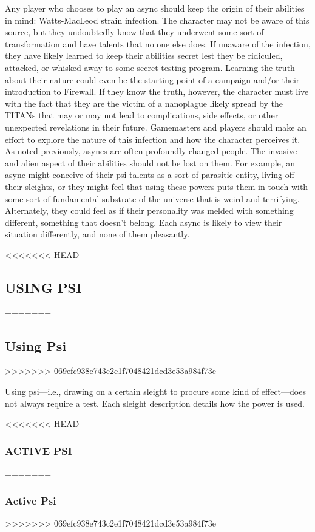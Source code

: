 Any player who chooses to play an async should keep the origin of their abilities in mind: Watts-MacLeod strain infection. The character may not be aware of this source, but they undoubtedly know that they underwent some sort of transformation and have talents that no one else does. If unaware of the infection, they have likely learned to keep their abilities secret lest they be ridiculed, attacked, or whisked away to some secret testing program. Learning the truth about their nature could even be the starting point of a campaign and/or their introduction to Firewall. If they know the truth, however, the character must live with the fact that they are the victim of a nanoplague likely spread by the TITANs that may or may not lead to complications, side effects, or other unexpected revelations in their future. Gamemasters and players should make an effort to explore the nature of this infection and how the character perceives it. As noted previously, asyncs are often profoundly-changed people. The invasive and alien aspect of their abilities should not be lost on them. For example, an async might conceive of their psi talents as a sort of parasitic entity, living off their sleights, or they might feel that using these powers puts them in touch with some sort of fundamental substrate of the universe that is weird and terrifying. Alternately, they could feel as if their personality was melded with something different, something that doesn’t belong. Each async is likely to view their situation differently, and none of them pleasantly. 

<<<<<<< HEAD \subsection{USING PSI} ======= \subsection{Using Psi} >>>>>>> 069efc938e743c2e1f7048421dcd3e53a984f73e 

Using psi—i.e., drawing on a certain sleight to procure some kind of effect—does not always require a test. Each sleight description details how the power is used. 

<<<<<<< HEAD \subsubsection{ACTIVE PSI} ======= \subsubsection{Active Psi} >>>>>>> 069efc938e743c2e1f7048421dcd3e53a984f73e 

